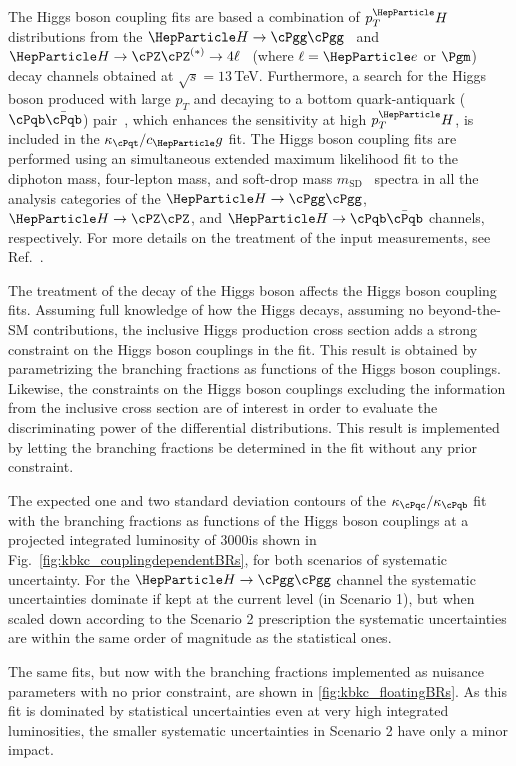 \documentclass[../report.tex]{subfiles}
\newcommand{\pt}{\ensuremath{p_T}\xspace}
\newcommand{\hboson}{\ensuremath{\PH}\xspace}
\newcommand{\bquark}{\ensuremath{\cPqb}\xspace}
\newcommand{\cquark}{\ensuremath{\cPqc}\xspace}
\newcommand{\tquark}{\ensuremath{\cPqt}\xspace}
\newcommand{\zboson}{\ensuremath{\cPZ}\xspace}
\newcommand{\photon}{\ensuremath{\cPgg}\xspace}
\newcommand{\electron}{\ensuremath{\Pe}\xspace}
\newcommand{\muon}{\ensuremath{\Pgm}\xspace}
\newcommand{\bb}{\ensuremath{\bquark\bar{\bquark}}\xspace}
\newcommand{\hbb}{\ensuremath{\hboson\to\bb}\xspace}
\newcommand{\hgg}{\ensuremath{\hboson\to\photon\photon}\xspace}
\newcommand{\hzz}{\ensuremath{\hboson\to\zboson\zboson}\xspace}
\newcommand{\hzztofourl}{\ensuremath{\hzz^{(\ast)}\to 4\ell}\xspace}
\newcommand{\pth}{\ensuremath{\pt^\hboson}\xspace}
\newcommand{\msd}{\ensuremath{m_\text{SD}}\xspace}
\newcommand{\cg}{\ensuremath{c_\Pg}\xspace}
\newcommand{\kappab}{\ensuremath{\kappa_{\bquark}}\xspace}
\newcommand{\kappac}{\ensuremath{\kappa_{\cquark}}\xspace}
\newcommand{\kappat}{\ensuremath{\kappa_{\tquark}}\xspace}
\begin{document}
The Higgs boson coupling fits are based a combination of $\pth$ distributions from the $\hgg$~\cite{Sirunyan:2018kta} and $\hzztofourl$~\cite{CMS_AN_2016-442} (where $\ell = \electron$ or $\muon$) decay channels obtained at $\sqrt{s}=13\,$TeV.
% 
Furthermore, a search for the Higgs boson produced with large \pt and decaying to a bottom quark-antiquark ($\bb$) pair~\cite{CMS_AN_2016-366}, which enhances the sensitivity at high $\pth$, is included in the $\kappat/\cg$ fit.
% 
The Higgs boson coupling fits are performed using an simultaneous extended maximum likelihood fit to the diphoton mass, four-lepton mass, and soft-drop mass $\msd$~\cite{Dasgupta:2013ihk,Larkoski:2014wba} spectra in all the analysis categories of the $\hgg$, $\hzz$, and $\hbb$ channels, respectively.
% 
For more details on the treatment of the input measurements, see Ref.~\cite{CMS-PAS-HIG-17-028}.



The treatment of the decay of the Higgs boson affects the Higgs boson coupling fits.
% 
Assuming full knowledge of how the Higgs decays, \ie assuming no beyond-the-SM contributions, the inclusive Higgs production cross section adds a strong constraint on the Higgs boson couplings in the fit.
% 
This result is obtained by parametrizing the branching fractions as functions of the Higgs boson couplings.
% 
Likewise, the constraints on the Higgs boson couplings excluding the information from the inclusive cross section are of interest in order to evaluate the discriminating power of the differential distributions.
% 
This result is implemented by letting the branching fractions be determined in the fit without any prior constraint.



The expected one and two standard deviation contours of the $\kappac/\kappab$ fit with the branching fractions  as functions of the Higgs boson couplings at a projected integrated luminosity of $3000$\fbinv is shown in Fig.~\ref{fig:kbkc_couplingdependentBRs}, for both scenarios of systematic uncertainty.
% 
For the $\hgg$ channel the systematic uncertainties dominate if kept at the current level (\ie in Scenario 1), but when scaled down according to the Scenario 2 prescription the systematic uncertainties are within the same order of magnitude as the statistical ones.



The same fits, but now with the branching fractions implemented as nuisance parameters with no prior constraint, are shown in \ref{fig:kbkc_floatingBRs}.
% 
As this fit is dominated by statistical uncertainties even at very high integrated luminosities, the smaller systematic uncertainties in Scenario 2 have only a minor impact.
\end{document}
